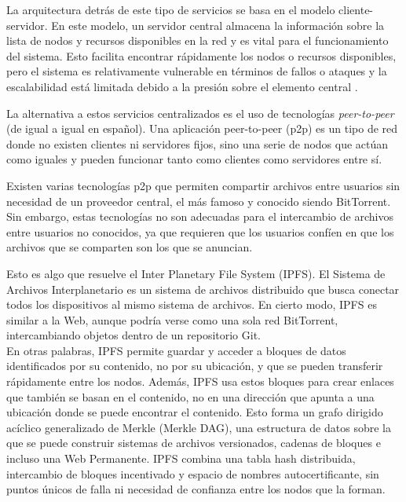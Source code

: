 La arquitectura detrás de este tipo de servicios se basa en el modelo cliente-servidor. En este modelo,
un servidor central almacena la información sobre la lista de nodos y recursos disponibles en la red y es vital para el
funcionamiento del sistema. Esto facilita encontrar rápidamente los nodos o recursos disponibles, pero el sistema es relativamente
vulnerable en términos de fallos o ataques y la escalabilidad está limitada debido a la presión sobre el elemento central \cite{vybochPeertopeerProtocolsFile2017}.

La alternativa a estos servicios centralizados es el uso de tecnologías \textit{peer-to-peer} (de igual a igual en español).
Una aplicación peer-to-peer (p2p) es un tipo de red donde no existen clientes ni servidores fijos,
sino una serie de nodos que actúan como iguales y pueden funcionar tanto como clientes como servidores entre sí.

Existen varias tecnologías p2p que permiten compartir archivos entre usuarios sin necesidad de un proveedor central, el
más famoso y conocido siendo BitTorrent\cite{BitTorrentProtocol}. Sin embargo, estas tecnologías no son adecuadas para el intercambio de archivos entre
usuarios no conocidos, ya que requieren que los usuarios confíen en que los archivos que se comparten son los que se anuncian.

Esto es algo que resuelve el Inter Planetary File System (IPFS).
El Sistema de Archivos Interplanetario es un sistema de archivos distribuido que busca conectar todos los dispositivos
al mismo sistema de archivos. En cierto modo, IPFS es similar a la Web, aunque podría verse como una sola red
BitTorrent, intercambiando objetos dentro de un repositorio Git.
\\En otras palabras, IPFS permite guardar y acceder a bloques de
datos identificados por su contenido, no por su ubicación, y que se pueden transferir rápidamente entre los nodos. Además, IPFS
usa estos bloques para crear enlaces que también se basan en el contenido, no en una dirección que apunta a una ubicación donde se puede encontrar el contenido.
Esto forma un grafo dirigido acíclico generalizado de Merkle (Merkle DAG), una estructura de datos sobre la que se puede
construir sistemas de archivos versionados, cadenas de bloques e incluso una Web Permanente. IPFS combina una tabla hash
distribuida, intercambio de bloques incentivado y espacio de nombres autocertificante, sin puntos únicos de falla ni necesidad
de confianza entre los nodos que la forman\cite{benetIPFSContentAddressed2014}.


